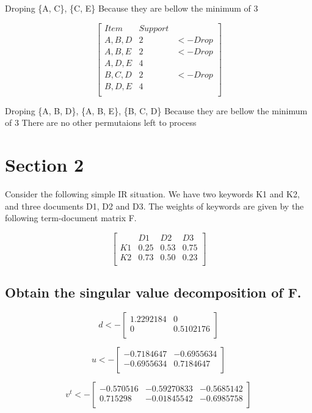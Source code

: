 \documentclass{report}
\begin{document}
Droping \{A, C\}, \{C, E\} Because they are bellow the minimum of 3

\[
  \begin{bmatrix}
    Item       & Support \\
    {A, B, D}  & 2       & <- Drop \\
    {A, B, E}  & 2       & <- Drop \\
    {A, D, E}  & 4       \\
    {B, C, D}  & 2       & <- Drop \\
    {B, D, E}  & 4       \\
  \end{bmatrix}
\]

Droping \{A, B, D\}, \{A, B, E\}, \{B, C, D\} Because they are bellow the minimum of 3
There are no other permutaions left to process

\chapter{Section 2}

Consider the following simple IR situation. We have two keywords K1 and K2, and three documents D1, D2 and D3. The weights of keywords are given by the following term-document matrix F.

\[
  \begin{bmatrix}
       & D1   & D2   & D3   \\
    K1 & 0.25 & 0.53 & 0.75 \\
    K2 & 0.73 & 0.50 & 0.23 \\
  \end{bmatrix}
\]

\section{Obtain the singular value decomposition of F.}

\[
  d <-
  \begin{bmatrix}
    1.2292184 & 0 \\
    0         & 0.5102176 \\
  \end{bmatrix}
\]

\[
  u <-
  \begin{bmatrix}
    -0.7184647 & -0.6955634 \\
    -0.6955634 &  0.7184647 \\
  \end{bmatrix}
\]

\[
  v^{t} <-
  \begin{bmatrix}
    -0.570516 & -0.59270833 & -0.5685142 \\
     0.715298 & -0.01845542 & -0.6985758 \\
  \end{bmatrix}
\]
\end{document}
